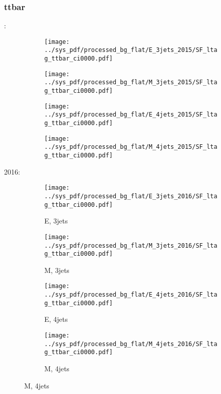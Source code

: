 \documentclass{beamer}
\begin{document}
\begin{frame}
\frametitle{ttbar}
\fontsize{5}{1}:
\begin{figure}
\centering
\begin{subfigure}[b]{0.24\textwidth}
\texttt{[image: ../sys\_pdf/processed\_bg\_flat/E\_3jets\_2015/SF\_ltag\_ttbar\_ci0000.pdf]}
\end{subfigure}
\begin{subfigure}[b]{0.24\textwidth}
\texttt{[image: ../sys\_pdf/processed\_bg\_flat/M\_3jets\_2015/SF\_ltag\_ttbar\_ci0000.pdf]}
\end{subfigure}
\begin{subfigure}[b]{0.24\textwidth}
\texttt{[image: ../sys\_pdf/processed\_bg\_flat/E\_4jets\_2015/SF\_ltag\_ttbar\_ci0000.pdf]}
\end{subfigure}
\begin{subfigure}[b]{0.24\textwidth}
\texttt{[image: ../sys\_pdf/processed\_bg\_flat/M\_4jets\_2015/SF\_ltag\_ttbar\_ci0000.pdf]}
\end{subfigure}
\end{figure}
2016:
\begin{figure}
\centering
\begin{subfigure}[b]{0.24\textwidth}
\texttt{[image: ../sys\_pdf/processed\_bg\_flat/E\_3jets\_2016/SF\_ltag\_ttbar\_ci0000.pdf]}
\captionsetup{font=tiny}
\caption{E, 3jets}
\end{subfigure}
\begin{subfigure}[b]{0.24\textwidth}
\texttt{[image: ../sys\_pdf/processed\_bg\_flat/M\_3jets\_2016/SF\_ltag\_ttbar\_ci0000.pdf]}
\captionsetup{font=tiny}
\caption{M, 3jets}
\end{subfigure}
\begin{subfigure}[b]{0.24\textwidth}
\texttt{[image: ../sys\_pdf/processed\_bg\_flat/E\_4jets\_2016/SF\_ltag\_ttbar\_ci0000.pdf]}
\captionsetup{font=tiny}
\caption{E, 4jets}
\end{subfigure}
\begin{subfigure}[b]{0.24\textwidth}
\texttt{[image: ../sys\_pdf/processed\_bg\_flat/M\_4jets\_2016/SF\_ltag\_ttbar\_ci0000.pdf]}
\captionsetup{font=tiny}
\caption{M, 4jets}
\end{subfigure}
\end{figure}
\end{frame}
\end{document}
